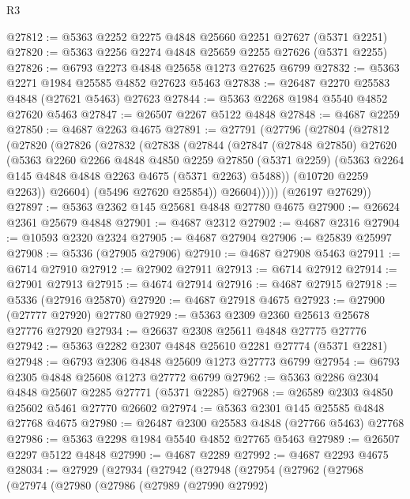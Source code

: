 \begin{lexlean}{R3}
\begin{coremodule}
@27812 := @5363 @2252 @2275 @4848 @25660 @2251 @27627 (@5371 @2251)
@27820 := @5363 @2256 @2274 @4848 @25659 @2255 @27626 (@5371 @2255)
@27826 := @6793 @2273 @4848 @25658 @1273 @27625 @6799
@27832 := @5363 @2271 @1984 @25585 @4852 @27623 @5463
@27838 := @26487 @2270 @25583 @4848 (@27621 @5463) @27623
@27844 := @5363 @2268 @1984 @5540 @4852 @27620 @5463
@27847 := @26507 @2267 @5122 @4848
@27848 := @4687 @2259
@27850 := @4687 @2263 @4675
@27891 := @27791
    (@27796
      (@27804
        (@27812
          (@27820
            (@27826
              (@27832
                (@27838
                  (@27844
                    (@27847
                      (@27848 @27850)
                      @27620
                      (@5363
                        @2260
                        @2266
                        @4848
                        @4850
                        @2259
                        @27850
                        (@5371 @2259)
                        (@5363 @2264 @145 @4848 @4848 @2263 @4675 (@5371 @2263) @5488))
                      (@10720 @2259 @2263))
                    @26604)
                  (@5496 @27620 @25854))
                @26604)))))
      (@26197 @27629))
@27897 := @5363 @2362 @145 @25681 @4848 @27780 @4675
@27900 := @26624 @2361 @25679 @4848
@27901 := @4687 @2312
@27902 := @4687 @2316
@27904 := @10593 @2320 @2324
@27905 := @4687 @27904
@27906 := @25839 @25997
@27908 := @5336 (@27905 @27906)
@27910 := @4687 @27908 @5463
@27911 := @6714 @27910
@27912 := @27902 @27911
@27913 := @6714 @27912
@27914 := @27901 @27913
@27915 := @4674 @27914
@27916 := @4687 @27915
@27918 := @5336 (@27916 @25870)
@27920 := @4687 @27918 @4675
@27923 := @27900 (@27777 @27920) @27780
@27929 := @5363 @2309 @2360 @25613 @25678 @27776 @27920
@27934 := @26637 @2308 @25611 @4848 @27775 @27776
@27942 := @5363 @2282 @2307 @4848 @25610 @2281 @27774 (@5371 @2281)
@27948 := @6793 @2306 @4848 @25609 @1273 @27773 @6799
@27954 := @6793 @2305 @4848 @25608 @1273 @27772 @6799
@27962 := @5363 @2286 @2304 @4848 @25607 @2285 @27771 (@5371 @2285)
@27968 := @26589 @2303 @4850 @25602 @5461 @27770 @26602
@27974 := @5363 @2301 @145 @25585 @4848 @27768 @4675
@27980 := @26487 @2300 @25583 @4848 (@27766 @5463) @27768
@27986 := @5363 @2298 @1984 @5540 @4852 @27765 @5463
@27989 := @26507 @2297 @5122 @4848
@27990 := @4687 @2289
@27992 := @4687 @2293 @4675
@28034 := @27929
    (@27934
      (@27942
        (@27948
          (@27954
            (@27962
              (@27968
                (@27974
                  (@27980
                    (@27986
                      (@27989
                        (@27990 @27992)

\end{coremodule}
\end{lexlean}
